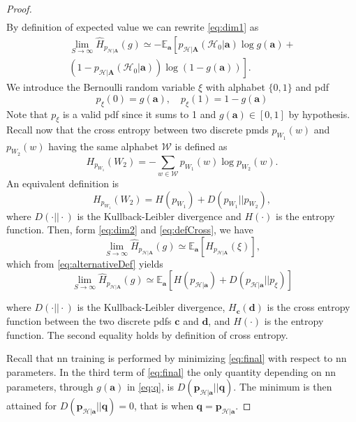 \documentclass[conference,final]{IEEEtran}
\newcommand{\cross}[2]{H_{#1}(#2)}
\newcommand{\hatcross}[2]{\hat{H}_{#1}(#2)}
\newcommand{\gy}{g(\bm a)}
\newcommand{\E}[2]{\mathbb{E}_{#1}\left[#2\right]}
\begin{document}
\begin{proof}
\begin{equation}
\begin{split}
\end{split}
\end{equation}
By definition of expected value we can rewrite \eqref{eq:dim1} as
\begin{equation}
		\label{eq:dim2}
		\begin{split}
	\lim_{S \to \infty}	\hatcross{p_{\mathcal{H}|\bm A}}{g} \simeq - \mathbb{E}_{\bm a} \left[ p_{\mathcal{H}|\bm A}(\mathcal{H}_0|\bm a) \log \gy + \right.\\ 
			\left. (1-p_{\mathcal{H}|\bm A}(\mathcal{H}_0|\bm a)) \log(1-\gy)\right].  		
		\end{split}
\end{equation}
We introduce the Bernoulli random variable $\xi$ with alphabet $ \{0,1\}$ and \ac{pdf} 
\begin{equation}
\label{eq:q}
p_\xi(0) = \gy, \quad
p_\xi(1) = 1- \gy
\end{equation}
Note that $p_\xi$ is a valid \ac{pdf} since it sums to 1 and $\gy \in [0,1]$ by hypothesis.
Recall now that the cross entropy between two discrete \acp{pmd} $p_{W_1}(w)$ and $p_{W_2}(w)$ having the same alphabet $\mathcal{W}$ is defined as
\begin{equation}
\label{eq:defCross}
	\cross{p_{W_1}}{W_2} = - \sum_{w \in \mathcal{W}} p_{W_1}(w) \log p_{W_2}(w).
\end{equation}
An equivalent definition is
\begin{equation}
\label{eq:alternativeDef}
		\cross{p_{W_1}}{W_2} = H (p_{W_1}) + D(p_{W_1}||p_{W_2}),
\end{equation}
where $D(\cdot||\cdot)$ is the Kullback-Leibler divergence and $H(\cdot)$ is the entropy function.
Then, form \eqref{eq:dim2} and \eqref{eq:defCross}, we have 
\begin{equation}
		\lim_{S \to \infty}	\hatcross{p_{\mathcal{H}|\bm A}}{g} \simeq \mathbb{E}_{\bm a} \left[ \cross{p_{\mathcal{H}|\bm A}}{\xi} \right],
\end{equation}
which from \eqref{eq:alternativeDef} yields
\begin{equation}
\label{eq:final}
		\lim_{S \to \infty}	\hatcross{p_{\mathcal{H}|\bm A}}{g} \simeq 
		\E{\bm a}{H ( p_{\mathcal{H}|\bm a}) + D( p_{\mathcal{H}|\bm a}|| p_\xi)}
\end{equation}

where $D(\cdot||\cdot)$ is the Kullback-Leibler divergence, $H_{\bm c}(\bm d)$ is the cross entropy function between the two discrete \acp{pdf} $\bm c$ and $\bm d$, and $H(\cdot)$ is the entropy function. The second equality holds by definition of cross entropy.

Recall that \ac{nn} training is performed by minimizing \eqref{eq:final} with respect to \ac{nn} parameters. In the third term of \eqref{eq:final} the only quantity depending on \ac{nn} parameters, through $\gy$ in \eqref{eq:q}, is $D(\bm p_{\mathcal{H}|\bm a}||\bm q)$. The minimum is then attained for $D(\bm p_{\mathcal{H}|\bm a}||\bm q)=0$, that is when $\bm q = \bm p_{\mathcal{H}|\bm a}$.
\end{proof}
\end{document}
